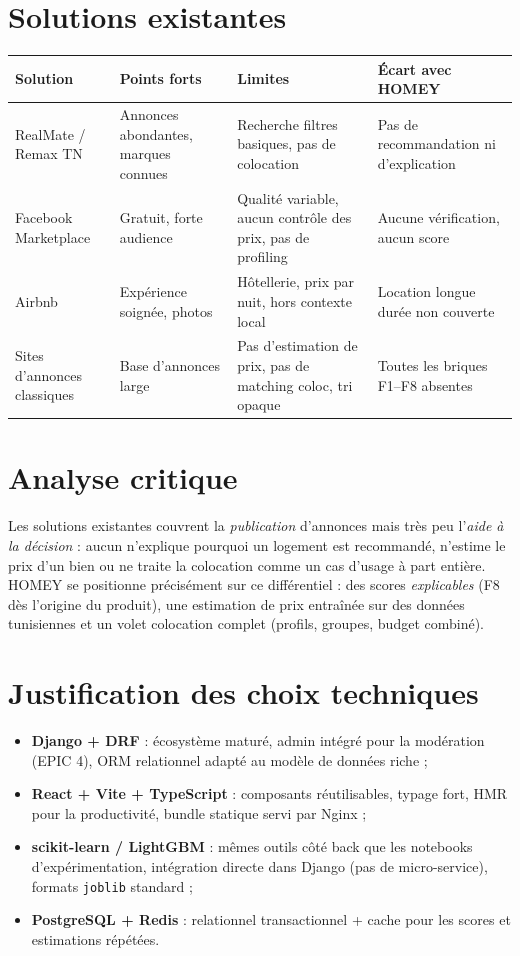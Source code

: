 \documentclass[11pt,a4paper]{report}
\begin{document}
\section{Solutions existantes}
\begin{center}
\small
\begin{tabularx}{\textwidth}{lXXX}
\toprule
\textbf{Solution} & \textbf{Points forts} & \textbf{Limites} & \textbf{Écart avec HOMEY} \\
\midrule
RealMate / Remax TN & Annonces abondantes, marques connues & Recherche filtres basiques,
pas de colocation & Pas de recommandation ni d'explication \\
\addlinespace
Facebook Marketplace & Gratuit, forte audience & Qualité variable, aucun contrôle des prix,
pas de profiling & Aucune vérification, aucun score \\
\addlinespace
Airbnb & Expérience soignée, photos & Hôtellerie, prix par nuit, hors contexte local &
Location longue durée non couverte \\
\addlinespace
Sites d'annonces classiques & Base d'annonces large & Pas d'estimation de prix, pas de matching
coloc, tri opaque & Toutes les briques F1--F8 absentes \\
\bottomrule
\end{tabularx}
\end{center}

\section{Analyse critique}
Les solutions existantes couvrent la \emph{publication} d'annonces mais très peu l'\emph{aide à la
décision} : aucun n'explique pourquoi un logement est recommandé, n'estime le prix d'un bien ou
ne traite la colocation comme un cas d'usage à part entière. HOMEY se positionne précisément sur
ce différentiel : des scores \emph{explicables} (F8 dès l'origine du produit), une estimation de
prix entraînée sur des données tunisiennes et un volet colocation complet (profils, groupes,
budget combiné).

\section{Justification des choix techniques}
\begin{itemize}[leftmargin=*]
  \item \textbf{Django + DRF} : écosystème maturé, admin intégré pour la modération (EPIC 4),
        ORM relationnel adapté au modèle de données riche ;
  \item \textbf{React + Vite + TypeScript} : composants réutilisables, typage fort, HMR pour la
        productivité, bundle statique servi par Nginx ;
  \item \textbf{scikit-learn / LightGBM} : mêmes outils côté back que les notebooks d'expérimentation,
        intégration directe dans Django (pas de micro-service), formats \texttt{joblib} standard ;
  \item \textbf{PostgreSQL + Redis} : relationnel transactionnel + cache pour les scores et
        estimations répétées.
\end{itemize}
\end{document}
